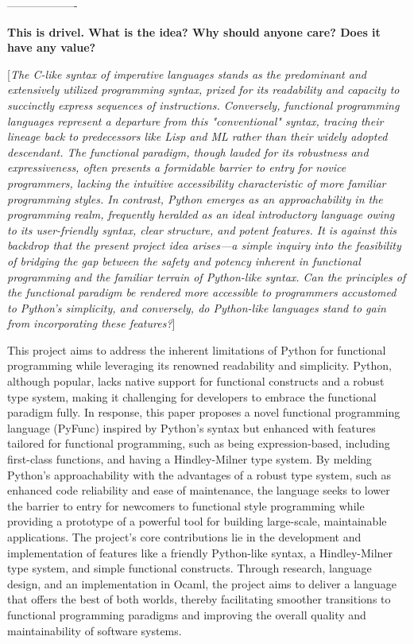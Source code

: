 \documentclass{l4proj}
\begin{document}

\begin{center}
    -------------------
\end{center}


\textbf{This is drivel. What is the idea? Why should anyone care? Does it have any value?}

[\emph{The C-like syntax of imperative languages stands as the predominant and extensively utilized programming syntax, prized for its readability and capacity to succinctly express sequences of instructions.
Conversely, functional programming languages represent a departure from this "conventional" syntax, tracing their lineage back to predecessors like Lisp and ML rather than their widely adopted descendant.
The functional paradigm, though lauded for its robustness and expressiveness, often presents a formidable barrier to entry for novice programmers, lacking the intuitive accessibility characteristic of more familiar programming styles.
In contrast, Python emerges as an approachability in the programming realm, frequently heralded as an ideal introductory language owing to its user-friendly syntax, clear structure, and potent features.
It is against this backdrop that the present project idea arises—a simple inquiry into the feasibility of bridging the gap between the safety and potency inherent in functional programming and the familiar terrain of Python-like syntax.
Can the principles of the functional paradigm be rendered more accessible to programmers accustomed to Python's simplicity, and conversely, do Python-like languages stand to gain from incorporating these features?}]

This project aims to address the inherent limitations of Python for functional programming while leveraging its renowned readability and simplicity.
Python, although popular, lacks native support for functional constructs and a robust type system, making it challenging for developers to embrace the functional paradigm fully.
In response, this paper proposes a novel functional programming language (PyFunc) inspired by Python's syntax but enhanced with features tailored for functional programming, such as being expression-based, including first-class functions, and having a Hindley-Milner type system.
By melding Python's approachability with the advantages of a robust type system, such as enhanced code reliability and ease of maintenance, the language seeks to lower the barrier to entry for newcomers to functional style programming while providing a prototype of a powerful tool for building large-scale, maintainable applications.
The project's core contributions lie in the development and implementation of features like a friendly Python-like syntax, a Hindley-Milner type system, and simple functional constructs.
Through research, language design, and an implementation in Ocaml, the project aims to deliver a language that offers the best of both worlds, thereby facilitating smoother transitions to functional programming paradigms and improving the overall quality and maintainability of software systems.
\end{document}
